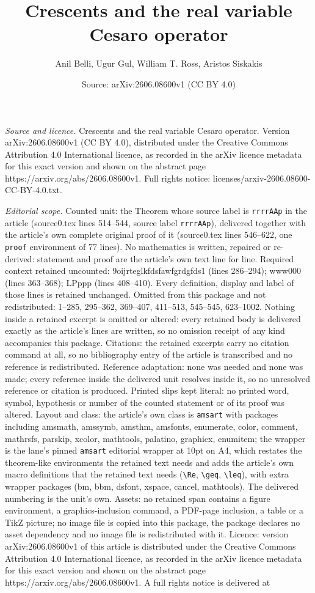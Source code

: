 \documentclass[10pt,a4paper]{amsart}
\title[Crescents and the real variable Cesaro operator]{Crescents and the real variable Cesaro operator}
\author{Anil Belli, Ugur Gul, William T. Ross, Aristos Siskakis}
\date{Source: arXiv:2606.08600v1 (CC BY 4.0)}
\begin{document}
\maketitle

\noindent\emph{Source and licence.} Crescents and the real variable Cesaro operator. Version arXiv:2606.08600v1 (CC BY 4.0), distributed under the Creative Commons Attribution 4.0 International licence, as recorded in the arXiv licence metadata for this exact version and shown on the abstract page https://arxiv.org/abs/2606.08600v1. Full rights notice: licenses/arxiv-2606.08600-CC-BY-4.0.txt.\par\smallskip

\noindent\textit{Editorial scope.} Counted unit: the Theorem whose source label is \texttt{rrrrAAp} in the article (source0.tex lines 514--544, source label \texttt{rrrrAAp}), delivered together with the article's own complete original proof of it (source0.tex lines 546--622, one \texttt{proof} environment of 77 lines). No mathematics is written, repaired or re-derived: statement and proof are the article's own text line for line. Required context retained uncounted: 9oijrteglkfdsfawfgrdgfds1 (lines 286--294); www000 (lines 363--368); LPppp (lines 408--410). Every definition, display and label of those lines is retained unchanged. Omitted from this package and not redistributed: 1--285, 295--362, 369--407, 411--513, 545--545, 623--1002. Nothing inside a retained excerpt is omitted or altered: every retained body is delivered exactly as the article's lines are written, so no omission receipt of any kind accompanies this package. Citations: the retained excerpts carry no citation command at all, so no bibliography entry of the article is transcribed and no reference is redistributed. Reference adaptation: none was needed and none was made; every reference inside the delivered unit resolves inside it, so no unresolved reference or citation is produced. Printed slips kept literal: no printed word, symbol, hypothesis or number of the counted statement or of its proof was altered. Layout and class: the article's own class is \texttt{amsart} with packages including amsmath, amssymb, amsthm, amsfonts, enumerate, color, comment, mathrsfs, parskip, xcolor, mathtools, palatino, graphicx, enumitem; the wrapper is the lane's pinned \texttt{amsart} editorial wrapper at 10pt on A4, which restates the theorem-like environments the retained text needs and adds the article's own macro definitions that the retained text needs (\texttt{\textbackslash Re}, \texttt{\textbackslash geq}, \texttt{\textbackslash leq}), with extra wrapper packages (bm, bbm, dsfont, xspace, cancel, mathtools). The delivered numbering is the unit's own. Assets: no retained span contains a figure environment, a graphics-inclusion command, a PDF-page inclusion, a table or a TikZ picture; no image file is copied into this package, the package declares no asset dependency and no image file is redistributed with it. Licence: version arXiv:2606.08600v1 of this article is distributed under the Creative Commons Attribution 4.0 International licence, as recorded in the arXiv licence metadata for this exact version and shown on the abstract page https://arxiv.org/abs/2606.08600v1. A full rights notice is delivered at 
\end{document}
